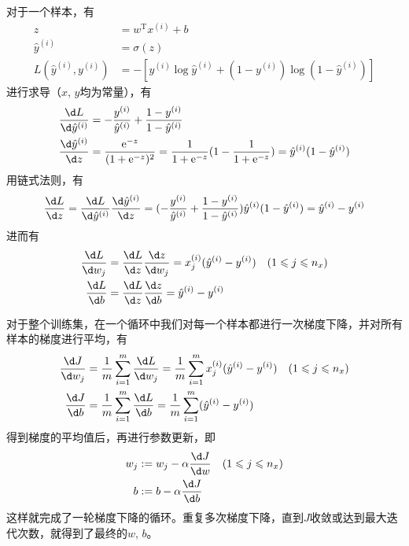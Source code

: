 对于一个样本，有
\begin{equation}
    \begin{aligned}
    z &= w^\mathrm{T} x^{(i)} + b \\
    \hat{y}^{(i)} &= \sigma(z) \\
    L(\hat{y}^{(i)}, y^{(i)}) &= -\left[y^{(i)} \log \hat{y}^{(i)} + (1 - y^{(i)}) \log (1 - \hat{y}^{(i)})\right]
    \end{aligned} 
    \label{eq:gradient_logistic_sample}
\end{equation}
进行求导（$x$, $y$均为常量），有
\begin{equation}
    \begin{aligned}
    &\frac{\d L}{\d \hat{y}^{(i)}} = -\frac{y^{(i)}}{\hat{y}^{(i)}} + \frac{1 - y^{(i)}}{1 - \hat{y}^{(i)}} \\
    &\frac{\d \hat{y}^{(i)}}{\d z} = \frac{\mathrm{e}^{-z}}{(1 + \mathrm{e}^{-z})^2} = \frac{1}{1 + \mathrm{e}^{-z}}(1 - \frac{1}{1 + \mathrm{e}^{-z}}) = \hat{y}^{(i)}(1 - \hat{y}^{(i)})\\
    \end{aligned}
\end{equation}
用链式法则，有
\begin{equation}
    \frac{\d L}{\d z} = \frac{\d L}{\d \hat{y}^{(i)}} \frac{\d \hat{y}^{(i)}}{\d z} = (-\frac{y^{(i)}}{\hat{y}^{(i)}} + \frac{1 - y^{(i)}}{1 - \hat{y}^{(i)}})\hat{y}^{(i)}(1 - \hat{y}^{(i)}) = \hat{y}^{(i)} - y^{(i)}
\end{equation}
进而有
\begin{equation}
    \begin{aligned}
    \frac{\d L}{\d w_j} &= \frac{\d L}{\d z} \frac{\d z}{\d w_j} = x_j^{(i)} (\hat{y}^{(i)} - y^{(i)}) \quad (1 \leqslant j \leqslant n_x) \\
    \frac{\d L}{\d b} &= \frac{\d L}{\d z} \frac{\d z}{\d b} = \hat{y}^{(i)} - y^{(i)}
    \end{aligned}
\end{equation}

对于整个训练集，在一个循环中我们对每一个样本都进行一次梯度下降，并对所有样本的梯度进行平均，有
\begin{equation}
    \begin{aligned}
        \frac{\d J}{\d w_j} &= \frac{1}{m} \sum_{i=1}^{m} \frac{\d L}{\d w_j} = \frac{1}{m} \sum_{i=1}^{m} x_j^{(i)} (\hat{y}^{(i)} - y^{(i)}) \quad (1 \leqslant j \leqslant n_x)\\
        \frac{\d J}{\d b} &= \frac{1}{m} \sum_{i=1}^{m} \frac{\d L}{\d b} = \frac{1}{m} \sum_{i=1}^{m} (\hat{y}^{(i)} - y^{(i)})
    \end{aligned}
\end{equation}
得到梯度的平均值后，再进行参数更新，即
\begin{equation}
    \begin{aligned}
    w_j &:= w_j - \alpha \frac{\d J}{\d w} \quad (1 \leqslant j \leqslant n_x) \\
    b &:= b - \alpha \frac{\d J}{\d b}
    \end{aligned} 
\end{equation}
这样就完成了一轮梯度下降的循环。重复多次梯度下降，直到$J$收敛或达到最大迭代次数，就得到了最终的$w$, $b$。


